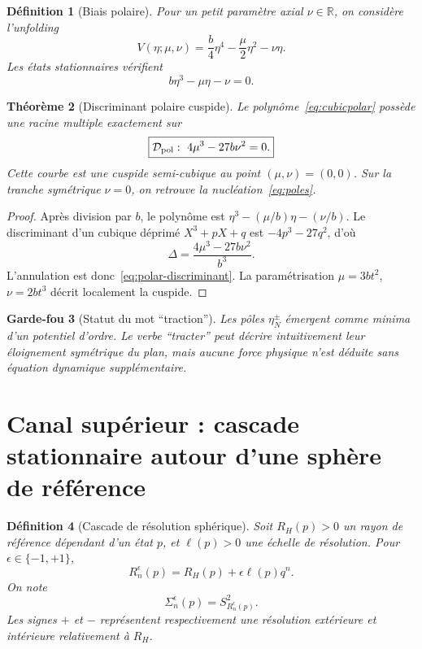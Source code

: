 \documentclass[11pt,a4paper]{article}
\newtheorem{theorem}{Théorème}[section]
\newtheorem{definition}[theorem]{Définition}
\newtheorem{guardrail}[theorem]{Garde-fou}
\newcommand{\R}{\mathbb R}
\begin{document}
\begin{definition}[Biais polaire]
Pour un petit paramètre axial $\nu\in\R$, on considère l'unfolding
\begin{equation}\label{eq:Vunfold}
 V(\eta;\mu,\nu)=\frac b4\eta^4-\frac\mu2\eta^2-\nu\eta.
\end{equation}
Les états stationnaires vérifient
\begin{equation}\label{eq:cubicpolar}
 b\eta^3-\mu\eta-\nu=0.
\end{equation}
\end{definition}

\begin{theorem}[Discriminant polaire cuspide]\label{thm:polar-cusp}
Le polynôme~\eqref{eq:cubicpolar} possède une racine multiple exactement sur
\begin{equation}\label{eq:polar-discriminant}
 \boxed{\mathcal D_{\rm pol}:\ 4\mu^3-27b\nu^2=0.}
\end{equation}
Cette courbe est une cuspide semi-cubique au point $(\mu,\nu)=(0,0)$. Sur la tranche symétrique $\nu=0$, on retrouve la nucléation~\eqref{eq:poles}.
\end{theorem}

\begin{proof}
Après division par $b$, le polynôme est $\eta^3-(\mu/b)\eta-(\nu/b)$. Le discriminant d'un cubique déprimé $X^3+pX+q$ est $-4p^3-27q^2$, d'où
\[
 \Delta=\frac{4\mu^3-27b\nu^2}{b^3}.
\]
L'annulation est donc~\eqref{eq:polar-discriminant}. La paramétrisation
$\mu=3b t^2$, $\nu=2b t^3$ décrit localement la cuspide.
\end{proof}

\begin{guardrail}[Statut du mot ``traction'']
Les pôles $\eta_N^\pm$ émergent comme minima d'un potentiel d'ordre. Le verbe ``tracter'' peut décrire intuitivement leur éloignement symétrique du plan, mais aucune force physique n'est déduite sans équation dynamique supplémentaire.
\end{guardrail}

\section{Canal supérieur : cascade stationnaire autour d'une sphère de référence}

\begin{definition}[Cascade de résolution sphérique]
Soit $R_H(p)>0$ un rayon de référence dépendant d'un état $p$, et $\ell(p)>0$ une échelle de résolution. Pour $\epsilon\in\{-1,+1\}$,
\begin{equation}\label{eq:Rn}
 R_n^{\epsilon}(p)=R_H(p)+\epsilon\ell(p)q^n.
\end{equation}
On note
\[
 \Sigma_n^\epsilon(p)=S^2_{R_n^\epsilon(p)}.
\]
Les signes $+$ et $-$ représentent respectivement une résolution extérieure et intérieure relativement à $R_H$.
\end{definition}
\end{document}
